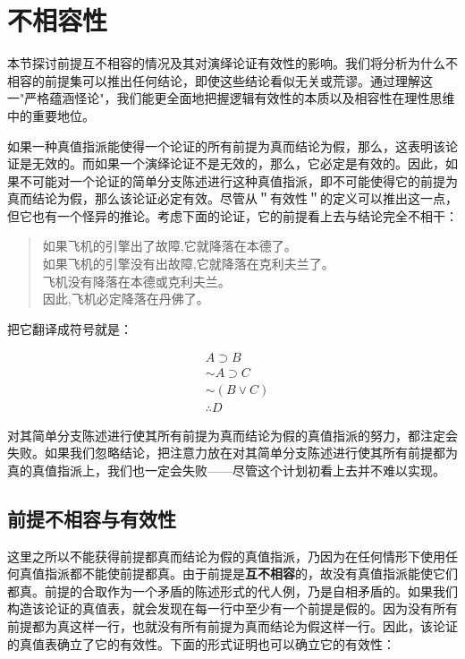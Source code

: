 \section{不相容性}

\begin{logicbox}[title=引言]
本节探讨前提互不相容的情况及其对演绎论证有效性的影响。我们将分析为什么不相容的前提集可以推出任何结论，即使这些结论看似无关或荒谬。通过理解这一"严格蕴涵怪论"，我们能更全面地把握逻辑有效性的本质以及相容性在理性思维中的重要地位。
\end{logicbox}

如果一种真值指派能使得一个论证的所有前提为真而结论为假，那么，这表明该论证是无效的。而如果一个演绎论证不是无效的，那么，它必定是有效的。因此，如果不可能对一个论证的简单分支陈述进行这种真值指派，即不可能使得它的前提为真而结论为假，那么该论证必定有效。尽管从＂有效性＂的定义可以推出这一点，但它也有一个怪异的推论。考虑下面的论证，它的前提看上去与结论完全不相干：

\begin{quote}
如果飞机的引擎出了故障,它就降落在本德了。\\
如果飞机的引擎没有出故障,它就降落在克利夫兰了。\\
飞机没有降落在本德或克利夫兰。\\
因此,飞机必定降落在丹佛了。
\end{quote}

把它翻译成符号就是：

$$
\begin{aligned}
& A \supset B \\
& \sim A \supset C \\
& \sim(B \vee C) \\
& \therefore D
\end{aligned}
$$

对其简单分支陈述进行使其所有前提为真而结论为假的真值指派的努力，都注定会失败。如果我们忽略结论，把注意力放在对其简单分支陈述进行使其所有前提都为真的真值指派上，我们也一定会失败——尽管这个计划初看上去并不难以实现。

\subsection{前提不相容与有效性}

这里之所以不能获得前提都真而结论为假的真值指派，乃因为在任何情形下使用任何真值指派都不能使前提都真。由于前提是\textbf{互不相容}的，故没有真值指派能使它们都真。前提的合取作为一个矛盾的陈述形式的代人例，乃是自相矛盾的。如果我们构造该论证的真值表，就会发现在每一行中至少有一个前提是假的。因为没有所有前提都为真这样一行，也就没有所有前提为真而结论为假这样一行。因此，该论证的真值表确立了它的有效性。下面的形式证明也可以确立它的有效性：

